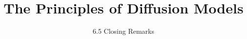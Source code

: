 
\title{The Principles of Diffusion Models}
\subtitle{6.5 Closing Remarks}


\begin{frame}
    \titlepage
\end{frame}


